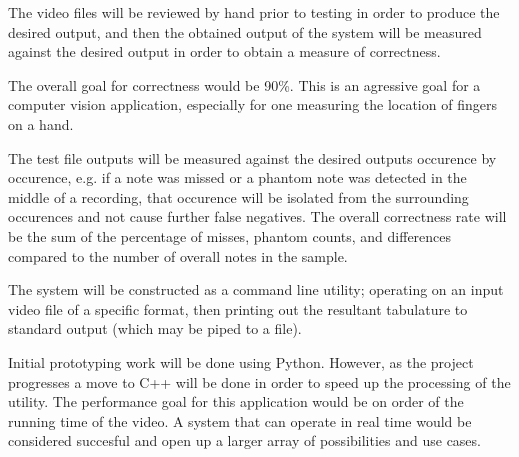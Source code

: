 The video files will be reviewed by hand prior to testing in order to produce the desired output,
and then the obtained output of the system will be measured against the desired output
in order to obtain a measure of correctness.

The overall goal for correctness would be 90\%.
This is an agressive goal for a computer vision application,
especially for one measuring the location of fingers on a hand.

The test file outputs will be measured against the desired outputs occurence by occurence,
e.g. if a note was missed or a phantom note was detected in the middle of a recording,
that occurence will be isolated from the surrounding occurences and not cause further false negatives.
The overall correctness rate will be the sum of the percentage of misses, phantom counts, and differences
compared to the number of overall notes in the sample.
\par
The system will be constructed as a command line utility;
operating on an input video file of a specific format,
then printing out the resultant tabulature to standard output
(which may be piped to a file).

Initial prototyping work will be done using Python.
However, as the project progresses a move to C++ will be done
in order to speed up the processing of the utility.
The performance goal for this application would be on order of
the running time of the video.
A system that can operate in real time would be considered succesful
and open up a larger array of possibilities and use cases.
